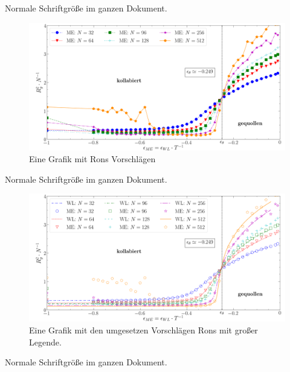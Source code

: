 Normale Schriftgröße im ganzen Dokument.
\begin{figure}[H]
\includegraphics[width=\textwidth]{Vorschlag_Ron}
\caption{Eine Grafik mit Rons Vorschlägen}
\end{figure}
Normale Schriftgröße im ganzen Dokument.
\begin{figure}[H]
\includegraphics[width=\textwidth]{pngwl_30_33}
\caption{Eine Grafik mit den umgesetzen Vorschlägen Rons mit großer Legende.}
\end{figure}
Normale Schriftgröße im ganzen Dokument.






